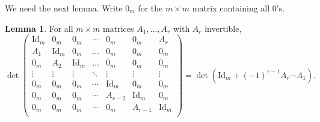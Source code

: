 \documentclass[12pt,reqno]{amsart}
\theoremstyle{definition}
\newtheorem{lem}[thm]{Lemma}
\begin{document}
We need the next lemma. Write $0_m$ for the $m \times m$ matrix containing all $0$'s.

\begin{lem}\label{det lem}
    For all $m\times m$ matrices $A_1,\ldots, A_r$ with $A_r$ invertible, 
    $$\det \begin{pmatrix}
        \mathrm{Id}_m & 0_m & 0_m & \cdots & 0_m &0_m &A_r \\
       A_1 & \mathrm{Id}_m & 0_m & \ldots & 0_m & 0_m & 0_m \\
        0_m & A_2 & \mathrm{Id}_m & \ldots & 0_m & 0_m &0_m \\
        \vdots & \vdots & \vdots & \ddots & \vdots & \vdots & \vdots \\
         0_m & 0_m & 0_m&  \cdots & \mathrm{Id}_m &  0_m  & 0_m\\
         0_m & 0_m & 0_m& \cdots & A_{r-2} &  \mathrm{Id}_m  & 0_m\\
        0_m & 0_m & 0_m & \cdots & 0_m & A_{r-1} & \mathrm{Id}_m \\
    \end{pmatrix} = \det\left( \mathrm{Id}_m + (-1)^{r-1}A_r\cdots A_1 \right).$$
\end{lem}
\end{document}

